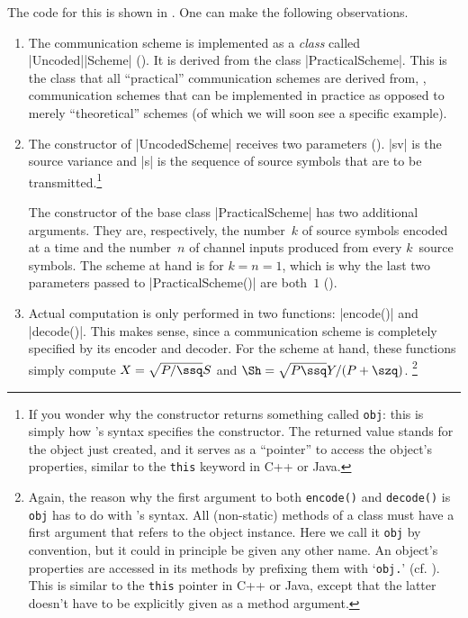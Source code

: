 The code for this is shown in .  One can make the following
observations.
\begin{enumerate}
  \item The communication scheme is implemented as a \emph{class} called
    |Uncoded|\-|Scheme| (). It is derived from the class
    |PracticalScheme|. This is the class that all ``practical'' communication
    schemes are derived from, \ie, communication schemes that can be implemented
    in practice as opposed to merely ``theoretical'' schemes (of which we will
    soon see a specific example).

  \item The constructor of |UncodedScheme| receives two parameters
    (). |sv| is the source variance and |s| is the sequence of source
    symbols that are to be transmitted.\footnote{If you wonder why the
    constructor returns something called \Verb+obj+: this is simply how
    \matlab's syntax specifies the constructor.  The returned value stands for
    the object just created, and it serves as a ``pointer'' to access the
    object's properties, similar to the \Verb+this+ keyword in C++ or Java.}

    The constructor of the base class |PracticalScheme| has two additional
    arguments. They are, respectively, the number~$k$ of source symbols encoded
    at a time and the number~$n$ of channel inputs produced from every
    $k$~source symbols. The scheme at hand is for $k = n = 1$, which is why the
    last two parameters passed to |PracticalScheme()| are both~$1$
    ().

  \item Actual computation is only performed in two functions: |encode()| and
    |decode()|. This makes sense, since a communication scheme is completely
    specified by its encoder and decoder.  For the scheme at hand, these
    functions simply compute $X = \sqrt{P/\ssq} S$ and $\Sh = \sqrt{P \ssq} Y /
    (P + \szq)$.%
    \footnote{Again, the reason why the first argument to both \Verb+encode()+
    and \Verb+decode()+ is \Verb+obj+ has to do with \matlab's syntax. All
    (non-static) methods of a class must have a first argument that refers to
    the object instance. Here we call it \Verb+obj+ by convention, but it could
    in principle be given any other name. An object's properties are accessed in
    its methods by prefixing them with `\Verb+obj.+' (cf.  ).
    This is similar to the \Verb+this+ pointer in C++ or Java, except that the
    latter doesn't have to be explicitly given as a method argument.}
\end{enumerate}


